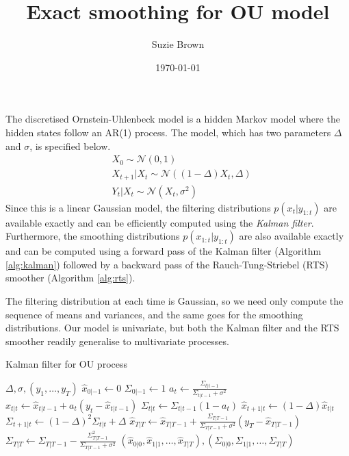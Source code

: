 \documentclass[fleqn]{article}
\title{Exact smoothing for OU model}
\author{Suzie Brown}
\date{\today}
\newcommand{\N}{\mathcal{N}}
\begin{document}
\maketitle
\thispagestyle{fancy}

The discretised Ornstein-Uhlenbeck model is a hidden Markov model where the hidden states follow an AR(1) process. The model, which has two parameters $\Delta$ and $\sigma$, is specified below.
\begin{align*}
& X_0 \sim \N(0,1) \\
& X_{t+1} | X_t \sim \N((1-\Delta)X_t, \Delta) \\
& Y_t | X_t \sim \N(X_t, \sigma^2)
\end{align*}
Since this is a linear Gaussian model, the filtering distributions $p(x_t | y_{1:t})$ are available exactly and can be efficiently computed using the \emph{Kalman filter}. Furthermore, the smoothing distributions $p(x_{1:t} | y_{1:t})$ are also available exactly and can be computed using a forward pass of the Kalman filter (Algorithm \ref{alg:kalman}) followed by a backward pass of the Rauch-Tung-Striebel (RTS) smoother (Algorithm \ref{alg:rts}).

The filtering distribution at each time is Gaussian, so we need only compute the sequence of means and variances, and the same goes for the smoothing distributions. Our model is univariate, but both the Kalman filter and the RTS smoother readily generalise to multivariate processes.

\begin{algorithm}
\caption{Kalman filter for OU process}
\label{alg:kalman}
\begin{algorithmic}[1]
\Require $\Delta, \sigma, (y_1, \dots, y_T)$
\State $\hat{x}_{0|-1} \gets 0$
\State $\Sigma_{0|-1} \gets 1$
	\State $a_t \gets \frac{\Sigma_{t|t-1}}{\Sigma_{t|t-1} + \sigma^2}$
	\State $\hat{x}_{t|t} \gets \hat{x}_{t|t-1} + a_t (y_t - \hat{x}_{t|t-1})$
	\State $\Sigma_{t|t} \gets \Sigma_{t|t-1} (1-a_t)$
	\State $\hat{x}_{t+1|t} \gets (1-\Delta)\hat{x}_{t|t}$
	\State $\Sigma_{t+1|t} \gets (1-\Delta)^2 \Sigma_{t|t} + \Delta$
\EndFor
\State $\hat{x}_{T|T} \gets \hat{x}_{T|T-1} + \frac{\Sigma_{T|T-1}}{\Sigma_{T|T-1} + \sigma^2}(y_T - \hat{x}_{T|T-1})$
\State $\Sigma_{T|T} \gets \Sigma_{T|T-1} - \frac{\Sigma_{T|T-1}^2}{\Sigma_{T|T-1} + \sigma^2}$
\State\Return $(\hat{x}_{0|0}, \hat{x}_{1|1}, \dots, \hat{x}_{T|T}), (\Sigma_{0|0}, \Sigma_{1|1}, \dots, \Sigma_{T|T})$
\end{algorithmic}
\end{algorithm}
\end{document}
